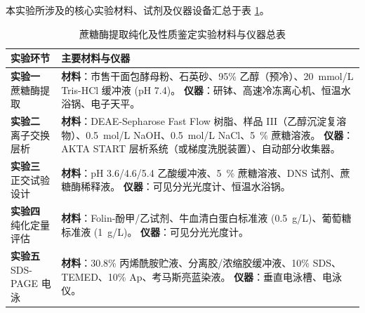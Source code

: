 \documentclass[10.5pt, a4paper]{ctexart}
\begin{document}
本实验所涉及的核心实验材料、试剂及仪器设备汇总于表 \ref{tab:all_materials}。
\begin{table}[H]
    \centering
    \caption{蔗糖酶提取纯化及性质鉴定实验材料与仪器总表}
    \label{tab:all_materials}
    \renewcommand{\arraystretch}{1.5} %
    \begin{tabular}{m{3.5cm}<{\centering} m{11cm}}
        \toprule
        \textbf{实验环节} & \textbf{主要材料与仪器} \\
        \midrule
        
        \makecell{\textbf{实验一} \\ 蔗糖酶提取} & 
        \textbf{材料}：市售干面包酵母粉、石英砂、95\% 乙醇（预冷）、\SI{20}{mmol/L} Tris-HCl 缓冲液 (pH 7.4)。 \newline
        \textbf{仪器}：研钵、高速冷冻离心机、恒温水浴锅、电子天平。 \\
        \midrule
        
        \makecell{\textbf{实验二} \\ 离子交换层析} & 
        \textbf{材料}：DEAE-Sepharose Fast Flow 树脂、样品 III（乙醇沉淀复溶物）、\SI{0.5}{mol/L} NaOH、\SI{0.5}{mol/L} NaCl、\SI{5}{\percent} 蔗糖溶液。 \newline
        \textbf{仪器}：AKTA START 层析系统（或梯度洗脱装置）、自动部分收集器。 \\
        \midrule
        
        \makecell{\textbf{实验三} \\ 正交试验设计} & 
        \textbf{材料}：pH 3.6/4.6/5.4 乙酸缓冲液、\SI{5}{\percent} 蔗糖溶液、DNS 试剂、蔗糖酶稀释液。 \newline
        \textbf{仪器}：可见分光光度计、恒温水浴锅。 \\
        \midrule
        
        \makecell{\textbf{实验四} \\ 纯化定量评估} & 
        \textbf{材料}：Folin-酚甲/乙试剂、牛血清白蛋白标准液 (\SI{0.5}{g/L})、葡萄糖标准液 (\SI{1}{g/L})。 \newline
        \textbf{仪器}：可见分光光度计。 \\
        \midrule
        
        \makecell{\textbf{实验五} \\ SDS-PAGE 电泳} & 
        \textbf{材料}：30.8\% 丙烯酰胺贮液、分离胶/浓缩胶缓冲液、10\% SDS、TEMED、10\% Ap、考马斯亮蓝染液。 \newline
        \textbf{仪器}：垂直电泳槽、电泳仪。 \\
        \midrule
        

\end{tabular}
\end{table}
\end{document}
